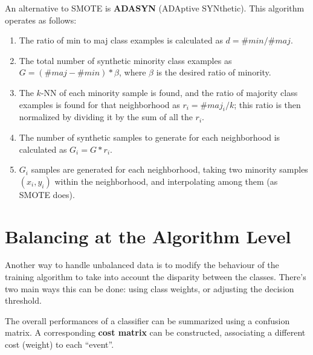 An alternative to SMOTE is \textbf{ADASYN} (ADAptive SYNthetic). This algorithm operates as follows:
\begin{enumerate}
    \item The ratio of min to maj class examples is calculated as $d = \#\textit{min}/\#\textit{maj}$.

    \item The total number of synthetic minority class examples as $G = (\#\textit{maj} - \#\textit{min})*\beta$, where $\beta$ is the desired ratio of minority.

    \item The $k$-NN of each minority sample is found, and the ratio of majority class examples is found for that neighborhood as $r_i = \#\textit{maj}_i / k$; this ratio is then normalized by dividing it by the sum of all the $r_i$.

    \item The number of synthetic samples to generate for each neighborhood is calculated as $G_i = G*r_i$.

    \item $G_i$ samples are generated for each neighborhood, taking two minority samples $(x_i, y_i)$ within the neighborhood, and interpolating among them (as SMOTE does).
\end{enumerate}

\section{Balancing at the Algorithm Level}

Another way to handle unbalanced data is to modify the behaviour of the training algorithm to take into account the disparity between the classes. There's two main ways this can be done: using class weights, or adjusting the decision threshold.

The overall performances of a classifier can be summarized using a confusion matrix. A corresponding \textbf{cost matrix} can be constructed, associating a different cost (weight) to each ``event''.

